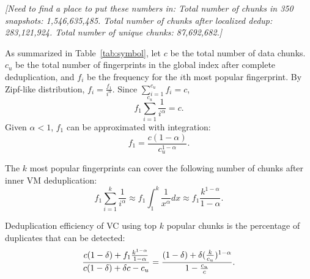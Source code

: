 {\it [Need to find a place to put these numbers in: Total number of chunks 
in 350 snapshots: 1,546,635,485. 
Total number of chunks after localized dedup: 283,121,924. Total number of unique chunks: 87,692,682.]}

As summarized in Table~\ref{tab:symbol},
let $c$ be the total number of data chunks. 
$c_u$ be the total number of fingerprints 
in the global index after complete deduplication, and
$f_i$ be the frequency for the $i$th most popular fingerprint. 
By Zipf-like distribution, $f_i = \frac{f_1}{i^\alpha}.$
Since $ \sum_{i=1}^{c_u}f_i = c$,
\[
f_1 \sum_{i=1}^{c_u}\frac{1}{i^\alpha} = c.
\]
Given $\alpha <1$, $f_1$ can be approximated with integration:
\begin{equation}
f_1=\frac{c(1-\alpha)}{c_u^{1-\alpha}}.
\end{equation}


The  $k$ most popular fingerprints can cover the following number of chunks after inner VM 
deduplication:
\[
f_1 \sum_{i=1}^{k}\frac{1}{i^\alpha} \approx  
f_1 \int_{1}^{k}\frac{1}{x^\alpha} dx  \approx  f_1\frac{  k^{1-\alpha}} {1-\alpha}.
\]

Deduplication efficiency of VC using top $k$ popular chunks
is the percentage of duplicates that can be detected:  
\begin{equation}
\frac{ c(1-\delta) + f_1\frac{  k^{1-\alpha}} {1-\alpha}} 
{c(1-\delta)  + \delta c - c_u }\\
= 
\frac{ (1-\delta) + \delta  (\frac{k}{c_u})^{1-\alpha}}
{ 1- \frac{c_u}{c} }.
\end{equation}



